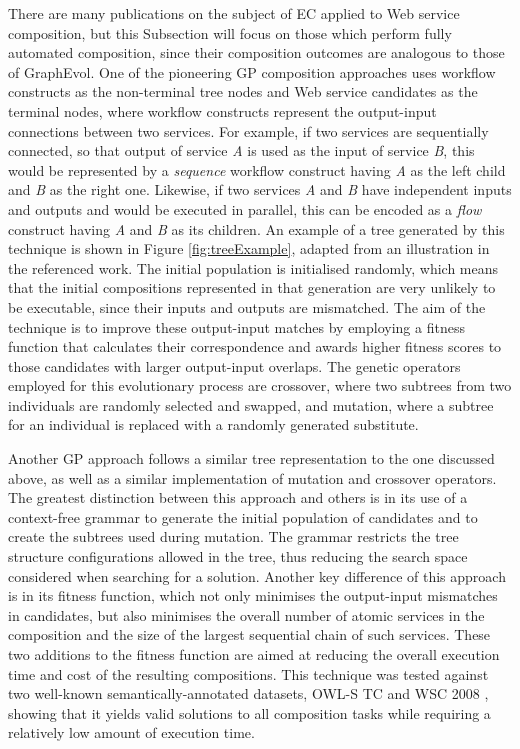 \documentclass{article}
\begin{document}
There are many publications on the subject of EC applied to Web service composition, but this Subsection will focus on those which perform fully automated composition,
since their composition outcomes are analogous to those of GraphEvol. One of the pioneering GP composition approaches \cite{aversano2006genetic} uses workflow constructs as the non-terminal tree nodes and Web service candidates as the terminal nodes, where workflow constructs represent the output-input connections between
two services. For example, if two services are sequentially connected, so that output of service \textit{A} is used as the input of service \textit{B}, this would be represented
by a \textit{sequence} workflow construct having \textit{A} as the left child and \textit{B} as the right one. Likewise, if two services \textit{A} and \textit{B} have independent inputs and outputs and would be executed in parallel, this can be encoded as a \textit{flow} construct having \textit{A} and \textit{B} as its children. An example of a tree generated by this technique is shown in Figure \ref{fig:treeExample}, adapted from an illustration in the referenced work. The initial population is initialised randomly, which means that the initial compositions represented in that generation are very unlikely to be executable, since their inputs and outputs are mismatched. The aim of the technique is to improve these output-input matches by employing a fitness function that calculates their correspondence and awards higher fitness scores to those candidates with larger output-input overlaps. The genetic operators employed for this evolutionary process are crossover, where two subtrees from two individuals are randomly selected and swapped, and mutation, where a subtree for an individual is replaced with a randomly generated substitute.

Another GP approach \cite{rodriguez2010composition} follows a similar tree representation to the one discussed above, as well as a similar implementation of mutation and crossover operators. The greatest distinction between this approach and others is in its use of a context-free grammar to generate the initial population of candidates and to create the subtrees used during mutation. The grammar restricts the tree structure configurations allowed in the tree, thus reducing the search space considered when searching for a solution. Another key difference of this approach is in its fitness function, which not only minimises the output-input mismatches in candidates, but also minimises the overall number of atomic services in the composition and the size of the largest sequential chain of such services. These two additions to the fitness function are aimed at reducing the overall execution time and cost of the resulting compositions. This technique was tested against two well-known semantically-annotated datasets, OWL-S TC \cite{kuster2008opossum} and WSC 2008 \cite{bansal2008wsc}, showing that it yields valid solutions to all composition tasks while requiring a relatively low amount of execution time.
\end{document}
